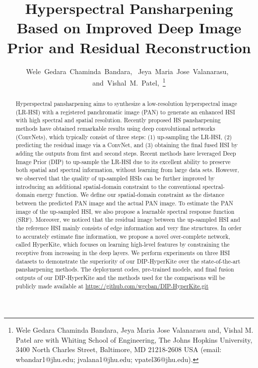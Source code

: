 \documentclass[journal]{IEEEtran}
\begin{document}
\title{Hyperspectral Pansharpening Based on Improved Deep Image Prior and  Residual Reconstruction}

\author{Wele~Gedara~Chaminda~Bandara,~
        Jeya~Maria~Jose~Valanarasu,~
        and~Vishal~M.~Patel,~\thanks{Wele Gedara Chaminda Bandara, Jeya Maria Jose Valanarasu and, Vishal M. Patel are with Whiting School of Engineering, The Johns Hopkins University, 3400 North Charles Street, Baltimore, MD 21218-2608 USA (email: wbandar1@jhu.edu; jvalana1@jhu.edu; vpatel36@jhu.edu).}}







\maketitle

\begin{abstract}
\par Hyperspectral pansharpening aims to synthesize a low-resolution hyperspectral image (LR-HSI) with a registered panchromatic image (PAN) to generate an enhanced HSI with high spectral and spatial resolution.  Recently proposed HS pansharpening methods have obtained remarkable results using deep convolutional networks (ConvNets), which typically consist of three steps: (1) up-sampling the LR-HSI, (2) predicting the residual image via a ConvNet, and (3) obtaining the final fused HSI by adding the outputs from first and second steps.  Recent methods have leveraged Deep Image Prior (DIP) to up-sample the LR-HSI due to its excellent ability to preserve both spatial and spectral information, without learning from  large data sets. However, we observed that the quality of up-sampled HSIs can be further improved by introducing an additional spatial-domain constraint to the conventional spectral-domain energy function. We define our spatial-domain constraint as the  distance between the predicted PAN image and the actual PAN image. To estimate the PAN image of the up-sampled HSI, we also propose a learnable spectral response function (SRF). Moreover, we noticed that the residual image between the up-sampled HSI and the reference HSI mainly consists of edge information and very fine structures. In order to accurately estimate fine information, we propose a novel over-complete network, called HyperKite, which focuses on learning high-level features by constraining the receptive from increasing in the deep layers. We perform experiments on three HSI datasets to demonstrate the superiority of our DIP-HyperKite over the state-of-the-art pansharpening methods. The deployment codes, pre-trained models, and final fusion outputs of our DIP-HyperKite and the methods used for the comparisons will be publicly made available at \url{https://github.com/wgcban/DIP-HyperKite.git}
\end{abstract}
\end{document}
